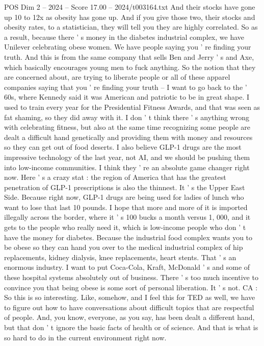 \begin{textsample}{POS Dim 2 – 2024 – Score 17.00 – 2024/t003164.txt}
And their stocks have gone up 10 to 12x as obesity has gone up.
And if you give those two, their stocks and obesity rates, to a statistician, they will tell you they are highly correlated.
So as a result, because there ' s money in the diabetes industrial complex, we have Unilever celebrating obese women.
We have people saying you ' re finding your truth.
And this is from the same company that sells Ben and Jerry ' s and Axe, which basically encourages young men to fuck anything.
So the notion that they are concerned about, are trying to liberate people or all of these apparel companies saying that you ' re finding your truth -- I want to go back to the ' 60s, where Kennedy said it was American and patriotic to be in great shape.
I used to train every year for the Presidential Fitness Awards, and that was seen as fat shaming, so they did away with it.
I don ' t think there ' s anything wrong with celebrating fitness, but also at the same time recognizing some people are dealt a difficult hand genetically and providing them with money and resources so they can get out of food deserts.
I also believe GLP-1 drugs are the most impressive technology of the last year, not AI, and we should be pushing them into low-income communities.
I think they ' re an absolute game changer right now.
Here ' s a crazy stat : the region of America that has the greatest penetration of GLP-1 prescriptions is also the thinnest.
It ' s the Upper East Side.
Because right now, GLP-1 drugs are being used for ladies of lunch who want to lose that last 10 pounds.
I hope that more and more of it is imported illegally across the border, where it ' s 100 bucks a month versus 1, 000, and it gets to the people who really need it, which is low-income people who don ' t have the money for diabetes.
Because the industrial food complex wants you to be obese so they can hand you over to the medical industrial complex of hip replacements, kidney dialysis, knee replacements, heart stents.
That ' s an enormous industry.
I want to put Coca-Cola, Kraft, McDonald ' s and some of these hospital systems absolutely out of business.
There ' s too much incentive to convince you that being obese is some sort of personal liberation.
It ' s not.
CA : So this is so interesting.
Like, somehow, and I feel this for TED as well, we have to figure out how to have conversations about difficult topics that are respectful of people.
And, you know, everyone, as you say, has been dealt a different hand, but that don ' t ignore the basic facts of health or of science.
And that is what is so hard to do in the current environment right now.

\end{textsample}
